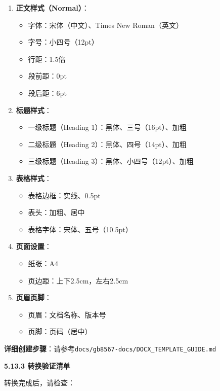 \documentclass[12pt,a4paper]{article}
\numberwithin{equation}{section}  %
\begin{document}
\begin{enumerate}
\item \textbf{正文样式（Normal）}：
\begin{itemize}
\item 字体：宋体（中文）、Times New Roman（英文）
\item 字号：小四号（12pt）
\item 行距：1.5倍
\item 段前距：0pt
\item 段后距：6pt

\end{itemize}
\item \textbf{标题样式}：
\begin{itemize}
\item 一级标题（Heading 1）：黑体、三号（16pt）、加粗
\item 二级标题（Heading 2）：黑体、四号（14pt）、加粗
\item 三级标题（Heading 3）：黑体、小四号（12pt）、加粗

\end{itemize}
\item \textbf{表格样式}：
\begin{itemize}
\item 表格边框：实线、0.5pt
\item 表头：加粗、居中
\item 表格字体：宋体、五号（10.5pt）

\end{itemize}
\item \textbf{页面设置}：
\begin{itemize}
\item 纸张：A4
\item 页边距：上下2.5cm，左右2.5cm

\end{itemize}
\item \textbf{页眉页脚}：
\begin{itemize}
\item 页眉：文档名称、版本号
\item 页脚：页码（居中）
\end{itemize}
\end{enumerate}

\textbf{详细创建步骤}：请参考\texttt{docs/gb8567-docs/DOCX\_TEMPLATE\_GUIDE.md}

\textbf{5.13.3 转换验证清单}

转换完成后，请检查：
\end{document}
